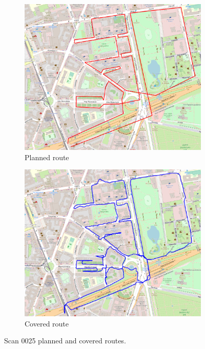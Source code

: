 \documentclass[a4paper,12pt]{book}
\begin{document}
\begin{enumerate}
\begin{figure}[H]
\begin{subfigure}{.84\textwidth}
			\includegraphics[width=1\linewidth]{route_p25}
			\caption{Planned route}
			\label{fig:a25}
		\end{subfigure}%
		\linebreak
		\begin{subfigure}{.84\textwidth}
			\centering
			\includegraphics[width=1\linewidth]{route_c25}
			\caption{Covered route}
			\label{fig:b25}
		\end{subfigure}
		\caption{Scan 0025 planned and covered routes.}
		\label{fig:fig25}
	\end{figure}
\end{enumerate}
\end{document}
